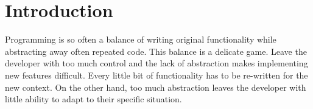 \section{Introduction}

Programming is so often a balance of writing original functionality while abstracting away often repeated code.  This balance is a delicate game.  Leave the developer with too much control and the lack of abstraction makes implementing new features difficult.  Every little bit of functionality has to be re-written for the new context.  On the other hand, too much abstraction leaves the developer with little ability to adapt to their specific situation.